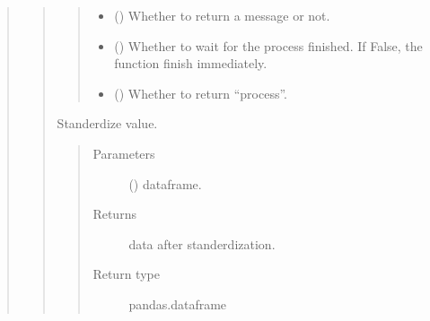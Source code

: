 \documentclass[letterpaper,10pt,english]{sphinxmanual}
\begin{document}
\begin{quote}
\begin{quote}
\begin{fulllineitems}
\begin{quote}
\begin{description}
\begin{itemize}
\item {} 
 () \textendash{} Whether to return a message or not.

\item {} 
 () \textendash{} Whether to wait for the process finished. If False, the function finish immediately.

\item {} 
 () \textendash{} Whether to return “process”.

\end{itemize}

\end{description}\end{quote}

\end{fulllineitems}


\begin{fulllineitems}
\label{\detokenize{modules/celloracle.utility:celloracle.utility.standard}}
Standerdize value.
\begin{quote}\begin{description}
\item[{Parameters}] \leavevmode
{} () \textendash{} dataframe.

\item[{Returns}] \leavevmode
data after standerdization.

\item[{Return type}] \leavevmode
pandas.dataframe

\end{description}\end{quote}

\end{fulllineitems}



\end{quote}
\end{quote}
\end{document}
